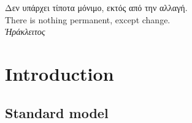 \newcommand{\myStringStyle}[1]{{\footnotesize\sffamily\color{violet!100!black} #1}}
 
\newcommand{\mySymbolStyle}[1]{{\footnotesize\sffamily\color{violet!100!black} #1}}
 
\newcommand{\myKeywordStyle}[1]{{\footnotesize\sffamily\color{green!70!black} #1}}
 
\newcommand{\myGlobalStyle}[1]{{\footnotesize\sffamily\color{blue!100!black} #1}}
 
\newcommand{\myNumberStyle}[1]{{\footnotesize\sffamily\color{brown!100!black} #1}}











\thispagestyle{empty}
\clearpage
\begin{center}

\hspace{0pt}
\vfill

\Large\foreignlanguage{greek}{Δεν υπάρχει τίποτα μόνιμο, εκτός από την αλλαγή.\\}
\vspace{0.5cm}
\normalsize{There is nothing permanent, except change.\\}
\vspace{1cm}
\color{auburn}\foreignlanguage{greek}{\textit{Ἡράκλειτος}}
\vfill
\hspace{0pt}
\end{center}
\pagebreak
%
\chapter{Introduction}
\section{Standard model}

